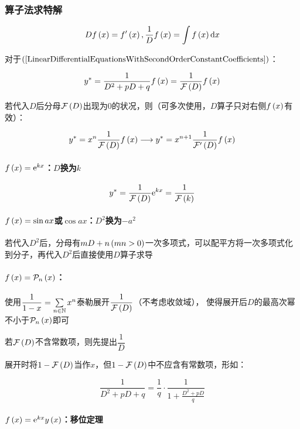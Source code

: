 \documentclass{article}
\begin{document}
\subsubsection{算子法求特解}

\begin{definition}[$D$算子]
    \[Df\left(x\right)=f^\prime\left(x\right),\frac1Df\left(x\right)=\int f\left(x\right)\mathrm d x\]
\end{definition}

对于$\left(\ref{LinearDifferentialEquationsWithSecondOrderConstantCoefficients}\right)$：

\[y^*=\frac1{D^2+pD+q}f\left(x\right)=\frac1{\mathcal F\left(D\right)}f\left(x\right)\]

若代入$D$后分母$\mathcal F\left(D\right)$出现为$0$的状况，则（可多次使用，$D$算子只对右侧$f\left(x\right)$有效）：

\[y^*=x^n\frac1{\mathcal F\left(D\right)}f\left(x\right)\longrightarrow y^*=x^{n+1}\frac1{\mathcal F^\prime\left(D\right)}f\left(x\right)\]

\paragraph{$f\left(x\right)=\mathrm e^{kx}$：$D$换为$k$}

\[y^*=\frac1{\mathcal F\left(D\right)}\mathrm e^{kx}=\frac1{\mathcal F\left(k\right)}\]

\paragraph{$f\left(x\right)=\sin ax$或$\cos ax$：$D^2$换为$-a^2$}

若代入$D^2$后，分母有$mD+n\left(mn>0\right)$一次多项式，可以配平方将一次多项式化到分子，再代入$D^2$后直接使用$D$算子求导

\paragraph{$f\left(x\right)=\mathcal P_n\left(x\right)$：}

使用$\dfrac1{1-x}=\sum\limits_{n\in\mathbb N}x^n$泰勒展开$\dfrac1{\mathcal F\left(D\right)}$（不考虑收敛域），
使得展开后$D$的最高次幂不小于$\mathcal P_n\left(x\right)$即可

若$\mathcal F\left(D\right)$不含常数项，则先提出$\dfrac1D$

展开时将$1-\mathcal F\left(D\right)$当作$x$，但$1-\mathcal F\left(D\right)$中不应含有常数项，形如：

\[\frac1{D^2+pD+q}=\frac1q\cdot\frac1{1+\frac{D^2+pD}q}\]

\paragraph{$f\left(x\right)=\mathrm e^{kx}y\left(x\right)$：移位定理}
\end{document}
